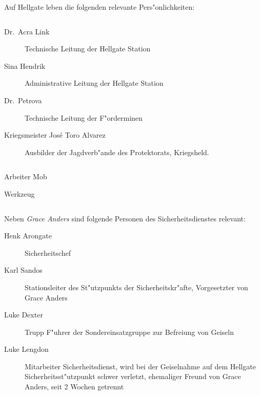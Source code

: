 
Auf Hellgate leben die folgenden relevante Pers"onlichkeiten: 

\begin{column}[l]{0.45}
    \begin{description}
        \item[Dr.~Acra Link] Technische Leitung der Hellgate Station
        \item[Sina Hendrik] Administrative Leitung der Hellgate Station
        \item[Dr.~Petrova] Technische Leitung der F"orderminen
        \item[Kriegsmeister Jos\'{e} \frqq{}Toro\flqq{} Alvarez] Ausbilder der Jagdverb"ande des Protektorats, Kriegsheld.
    \end{description}
\end{column}
\begin{column}[r]{0.45}
    \begin{nscsheet}[h]{Arbeiter Mob}
        \nscstats[]
        \nscruler
        \begin{nscinventory}
            \nscitem[Waffen] Werkzeug
        \end{nscinventory}
    \end{nscsheet}
\end{column}


Neben \emph{Grace Anders} sind folgende Personen des Sicherheitsdienstes relevant:

\begin{description}
    \item[Henk Arongate] Sicherheitschef    
    \item[Karl Sandos] Stationsleiter des St"utzpunkts der Sicherheitskr"afte, Vorgesetzter von Grace Anders
    \item[Luke Dexter] Trupp F"uhrer der Sondereinsatzgruppe zur Befreiung von Geiseln
    \item[Luke Lengdon] Mitarbeiter Sicherheitsdienst, wird bei der Geiselnahme auf dem Hellgate Sicherheitsst"utzpunkt 
        schwer verletzt, ehemaliger Freund von Grace Anders, seit 2 Wochen getrennt
\end{description}

\vfill\pagebreak
